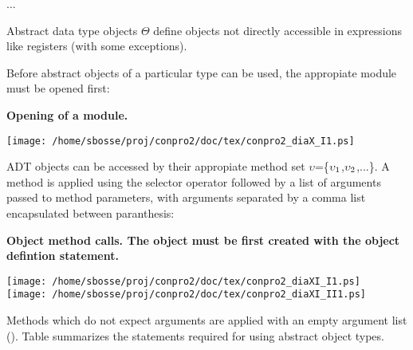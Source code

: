 \documentclass[a4paper,12pt,twoside,english]{article}
\begin{document}
\def\thesubsubsection{\tocXXXIX}
\secIII{\label{toclabelXXXIX}\thesubsubsection}
...

\vskip10pt
\def\thesubsubsection{\vrule width 0pt height 1.3 ex}

\def\thesubsection{\vrule width 0pt height 1.3 ex}

\def\thesection{\tocXL}
\secI{\label{toclabelXL}4\hfill\thesection}
Abstract data type objects $\Theta$ define objects  not directly accessible in expressions like registers
(with some exceptions).


\vskip5pt
Before abstract objects of a particular type can be used, the appropiate module must be opened first: 


\vskip5pt
\def\defcontent{
\begin{center}
\texttt{[image: /home/sbosse/proj/conpro2/doc/tex/conpro2\_diaX\_I1.ps]}\\\vskip3pt
\end{center}
}
\def\defdescription{
\caption{\bf Opening of a module.
}
\label{def:10}}
\begin{definition}[H]\let\normalsize\footnotesize \normalsize
\defdescription
\end{definition}
\defcontent
ADT objects can be accessed by their appropiate method set $\upsilon$=\{$\rm{\upsilon }_{1}$,$\rm{\upsilon }_{2}$,...\}. A method is applied using the selector
operator followed by a list of arguments passed to method parameters, with arguments separated by a comma list encapsulated between paranthesis:


\vskip5pt
\def\defcontent{
\begin{center}
\texttt{[image: /home/sbosse/proj/conpro2/doc/tex/conpro2\_diaXI\_I1.ps]}\\\vskip3pt
\texttt{[image: /home/sbosse/proj/conpro2/doc/tex/conpro2\_diaXI\_II1.ps]}\\\vskip3pt
\end{center}
}
\def\defdescription{
\caption{\bf Object method calls. The object must be first created with the object defintion statement.
}
\label{def:11}}
\begin{definition}[H]\let\normalsize\footnotesize \normalsize
\defdescription
\end{definition}
\defcontent
Methods which do not expect arguments are applied with an empty argument list (). Table  summarizes the statements required for using abstract
object types.
\end{document}
